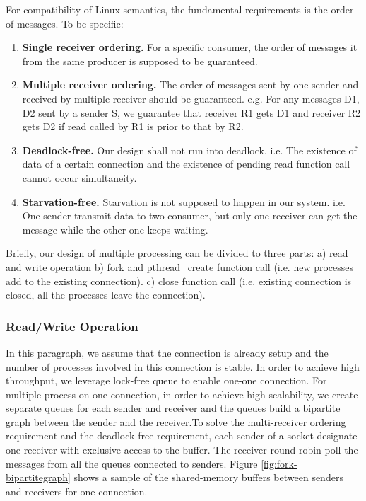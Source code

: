 For compatibility of Linux semantics, the fundamental requirements is the order of messages. To be specific:
\begin{enumerate}
\item \textbf{Single receiver ordering.} For a specific consumer, the order of messages it from the same producer is supposed to be guaranteed.
\item \textbf{Multiple receiver ordering.} The order of messages sent by one sender and received by multiple receiver should be guaranteed. e.g. For any messages D1, D2 sent by a sender S,  we guarantee that receiver R1 gets D1 and receiver R2 gets D2 if read called by R1 is prior to that by R2. 
\item \textbf{Deadlock-free.} Our design shall not run into deadlock. i.e. The existence of data of a certain connection and the existence of pending read function call cannot occur simultaneity.
\item \textbf{Starvation-free.} Starvation is not supposed to happen in our system. i.e. One sender transmit data to two consumer, but only one receiver can get the message while the other one keeps waiting.
\end{enumerate}

Briefly, our design of multiple processing can be divided to three parts: a) read and write operation b) fork and pthread\_create function call (i.e. new processes add to the existing connection). c) close function call (i.e. existing connection is closed, all the processes leave the connection).


\subsubsection{Read/Write Operation}
\label{subsubsec:fork_rdwr}

In this paragraph, we assume that the connection is already setup and the number of processes involved in this connection is stable. In order to achieve high throughput, we leverage lock-free queue to enable one-one connection. For multiple process on one connection, in order to achieve high scalability, we create separate queues for each sender and receiver and the queues build a bipartite graph between the sender and the receiver.To solve the multi-receiver ordering requirement and the deadlock-free requirement, each sender of a socket designate one receiver with exclusive access to the buffer. The receiver round robin poll the messages from all the queues connected to senders. Figure \ref{fig:fork-bipartitegraph} shows a sample of the shared-memory buffers between senders and receivers for one connection. 

